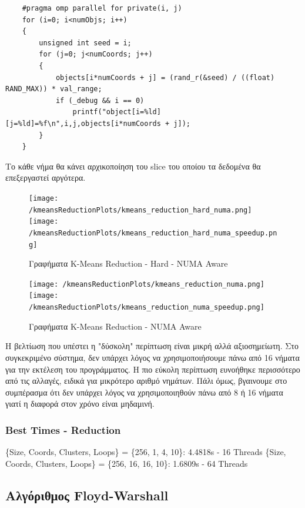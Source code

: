 \documentclass[letterpaper,12pt]{article}
\begin{document}
\begin{lstlisting}
    #pragma omp parallel for private(i, j)
    for (i=0; i<numObjs; i++)
    {
        unsigned int seed = i;
        for (j=0; j<numCoords; j++)
        {
            objects[i*numCoords + j] = (rand_r(&seed) / ((float) RAND_MAX)) * val_range;
            if (_debug && i == 0)
                printf("object[i=%ld][j=%ld]=%f\n",i,j,objects[i*numCoords + j]);
        }
    } 
\end{lstlisting}
Το κάθε νήμα θα κάνει αρχικοποίηση του slice του οποίου τα δεδομένα θα επεξεργαστεί αργότερα.

\begin{figure}[H]
    \centering
    \texttt{[image: /kmeansReductionPlots/kmeans\_reduction\_hard\_numa.png]}
    \texttt{[image: /kmeansReductionPlots/kmeans\_reduction\_hard\_numa\_speedup.png]}
    \caption{Γραφήματα K-Means Reduction - Hard - NUMA Aware}
\end{figure}

\begin{figure}[H]
    \centering
    \texttt{[image: /kmeansReductionPlots/kmeans\_reduction\_numa.png]}
    \texttt{[image: /kmeansReductionPlots/kmeans\_reduction\_numa\_speedup.png]}
    \caption{Γραφήματα K-Means Reduction - NUMA Aware}
    \label{fig:Γραφήματα K-Means Reduction - NUMA Aware}
\end{figure}

Η βελτίωση που υπέστει η "δύσκολη" περίπτωση είναι μικρή αλλά αξιοσημείωτη. Στο συγκεκριμένο σύστημα,
δεν υπάρχει λόγος να χρησιμοποιήσουμε πάνω από 16 νήματα για την εκτέλεση του προγράμματος.
Η πιο εύκολη περίπτωση ευνοήθηκε περισσότερο από τις αλλαγές, ειδικά για μικρότερο αριθμό νημάτων. Πάλι όμως,
βγαινουμε στο συμπέρασμα ότι δεν υπάρχει λόγος να χρησιμοποιηθούν πάνω από 8 ή 16 νήματα γιατί η διαφορά στον χρόνο
είναι μηδαμινή. 

\subsubsection*{Best Times - Reduction}

\{Size, Coords, Clusters, Loops\} = \{256, 1, 4, 10\}: 4.4818s - 16 Threads
\newline
\{Size, Coords, Clusters, Loops\} = \{256, 16, 16, 10\}: 1.6809s - 64 Threads
\newline

\subsection{Αλγόριθμος Floyd-Warshall}
\end{document}
